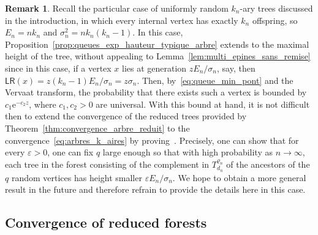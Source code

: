 \documentclass[10pt]{amsart}
\theoremstyle{definition}\newtheorem{defi}[theo]{Definition}\newtheorem{rema}[theo]{Remark}\newtheorem{exam}[theo]{Example}\newtheorem{exem}[theo]{Example}\newtheorem{nota}[theo]{Notation}
\newcommand{\1}{\ensembles{1}}
\newcommand{\LR}{\mathsf{LR}}
\newcommand{\e}{\mathrm{e}}
\newcommand{\fn}{T_{d_n}^{\varrho_n}}
\newcommand{\edges}{E}
\providecommand{\?}{}
\begin{document}
\begin{rema}\label{rem:k_ary}
Recall the particular case of uniformly random $k_{n}$-ary trees discussed in the introduction, in which every internal vertex has exactly $k_{n}$ offspring, so $\edges_{n} = n k_{n}$ and $\sigma_{n}^{2} = n k_{n} (k_{n}-1)$. In this case, Proposition~\ref{prop:queues_exp_hauteur_typique_arbre} extends to the maximal height of the tree, without appealing to Lemma~\ref{lem:multi_epines_sans_remise} since in this case, if a vertex $x$ lies at generation $z \edges_{n}/\sigma_{n}$, say, then $\LR(x) = z (k_{n}-1) \edges_{n}/\sigma_{n} = z \sigma_{n}$. Then, by~\eqref{eq:queue_min_pont} and the Vervaat transform, the probability that there exists such a vertex is bounded by $c_1 \e^{- c_2 z}$, where $c_{1}, c_{2} > 0$ are universal. With this bound at hand, it is not difficult then to extend the convergence of the reduced trees provided by Theorem~\ref{thm:convergence_arbre_reduit} to the convergence~\eqref{eq:arbres_k_aires} by proving~\cite[Equation~25]{Ald93}. Precisely, one can show that for every $\varepsilon>0$, one can fix $q$ large enough so that with high probability as $n\to\infty$, each tree in the forest consisting of the complement in $\fn$ of the ancestors of the $q$ random vertices has height smaller $\varepsilon \edges_n/\sigma_n$. We hope to obtain a more general result in the future and therefore refrain to provide the details here in this case.
\end{rema}



\subsection{Convergence of reduced forests}\label{sec:marginales_hauteur}
\end{document}
